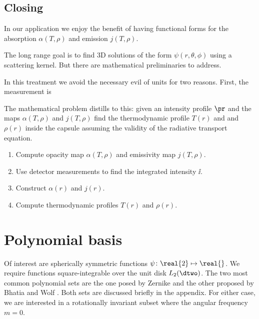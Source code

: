 \documentclass[final,leqno,onefignum,onetabnum]{siamltex1213}
\begin{document}
\subsection{Closing}
In our application we enjoy the benefit of having functional forms for the absorption $\alpha(T,\rho)$ and emission $j(T,\rho)$.

The long range goal is to find 3D solutions of the form $\psi(r,\theta,\phi)$ using a scattering kernel. But there are mathematical preliminaries to address.

In this treatment we avoid the necessary evil of units for two reasons. First, the measurement is 

The mathematical problem distills to this: given an intensity profile $\pr$ and the maps $\alpha(T,\rho)$ and $j(T,\rho)$ find the thermodynamic profile $T(r)$ and and $\rho(r)$ inside the capsule assuming the validity of the radiative transport equation.

\begin{enumerate}
  \item{Compute opacity map $\alpha(T,\rho)$ and emissivity map $j(T,\rho)$.}
  \item{Use detector measurements to find the integrated intensity $\ii$.}
  \item{Construct $\alpha(r)$ and $j(r)$.}
  \item{Compute thermodynamic profiles $T(r)$ and $\rho(r)$.}
\end{enumerate}


\section{Polynomial basis}

Of interest are spherically symmetric functions $\psi\colon \real{2} \mapsto \real{}$. We require functions square-integrable over the unit disk $L_{2}(\dtwo)$. The two most common polynomial sets are the one posed by Zernike \cite{Zernike} and the other proposed by Bhatia and Wolf \cite{Bhatia}. Both sets are discussed briefly in the appendix. For either case, we are interested in a rotationally invariant subset where the angular frequency $m=0$.

\end{document}
